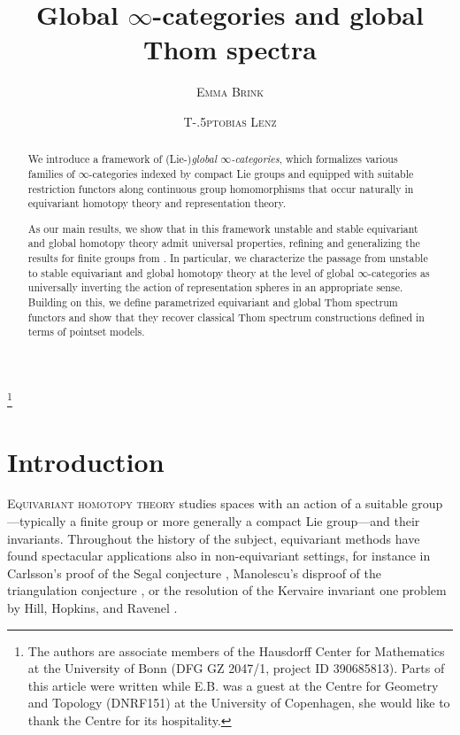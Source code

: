 \documentclass[reqno]{memo-l}
\theoremstyle{mythm}
\theoremstyle{definition}
\numberwithin{equation}{section}
\begin{document}
\title{Global $\bm\infty$-categories and global Thom spectra}
\author{\textsc{Emma Brink}}
\author{\textsc{T\kern-.5ptobias Lenz}}
\address{Mathematisches Institut, Rheinische Friedrich-Wilhelms-Universität Bonn, Endenicher Allee 60, 53115 Bonn, Germany}

\begin{abstract}
    We introduce a framework of (Lie-)\emph{global $\infty$-categories}, which formalizes various families of $\infty$-categories indexed by compact Lie groups and equipped with suitable restriction functors along continuous group homomorphisms that occur naturally in equivariant homotopy theory and representation theory. 

    As our main results, we show that in this framework unstable and stable equivariant and global homotopy theory admit universal properties, refining and generalizing the results for finite groups from \cites{CLL_Global,CLL_Clefts}. 
    In particular, we characterize the passage from unstable to stable equivariant and global homotopy theory at the level of global $\infty$-categories as universally inverting the action of representation spheres in an appropriate sense.
    Building on this, we define parametrized equivariant and global Thom spectrum functors and show that they recover classical Thom spectrum constructions defined in terms of pointset models.
\end{abstract}

\thanks{The authors are associate members of the Hausdorff Center for Mathematics at the University of Bonn (DFG GZ 2047/1, project ID 390685813). Parts of this article were written while E.B. was a guest at the Centre for Geometry and Topology (DNRF151) at the University of Copenhagen, she would like to thank the Centre for its hospitality.}

\frontmatter
\maketitle
\setcounter{tocdepth}{1}
\begingroup
{}
\tableofcontents
\endgroup

\mainmatter
\chapter*{Introduction}
\lettrine[findent=3pt,nindent=.25pt]{E}{quivariant homotopy theory} studies spaces with an action of a suitable group---typically a finite group or more generally a compact Lie group---and their invariants. Throughout the history of the subject, equivariant methods have found spectacular applications also in non-equivariant settings, for instance in Carlsson's proof of the Segal conjecture \cite{carlsson1984SegalConjecture}, Manolescu's disproof of the triangulation conjecture \cite{manolescu}, or the resolution of the Kervaire invariant one problem by Hill, Hopkins, and Ravenel \cite{HHR2016Kervaire}.
\end{document}
